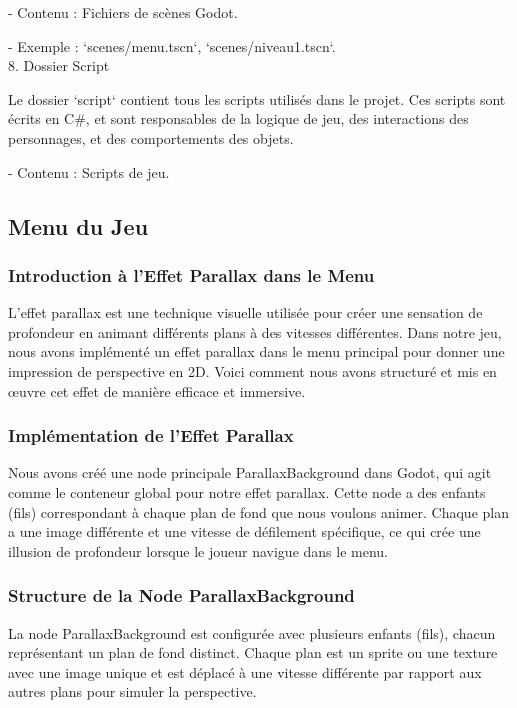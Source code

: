    - Contenu : Fichiers de scènes Godot.

   - Exemple : `scenes/menu.tscn`, `scenes/niveau1.tscn`.
\\

8. Dossier Script

   Le dossier `script` contient tous les scripts utilisés dans le projet. Ces scripts sont écrits en C\#, et sont responsables de la logique de jeu, des interactions des personnages, et des comportements des objets.

   - Contenu : Scripts de jeu.


      \subsection{Menu du Jeu }


      \subsubsection*{Introduction à l'Effet Parallax dans le Menu}
      L'effet parallax est une technique visuelle utilisée pour créer une sensation de profondeur en animant différents plans à des vitesses différentes.
      Dans notre jeu, nous avons implémenté un effet parallax dans le menu principal pour donner une impression de perspective en 2D. 
      Voici comment nous avons structuré et mis en œuvre cet effet de manière efficace et immersive.
      \\

      \subsubsection*{Implémentation de l'Effet Parallax}
      Nous avons créé une node principale ParallaxBackground dans Godot, qui agit comme le conteneur global pour notre effet parallax.
      Cette node a des enfants (fils) correspondant à chaque plan de fond que nous voulons animer. Chaque plan a une image différente et une
      vitesse de défilement spécifique, ce qui crée une illusion de profondeur lorsque le joueur navigue dans le menu.
      \\

      \subsubsection*{Structure de la Node ParallaxBackground}
      La node ParallaxBackground est configurée avec plusieurs enfants (fils), chacun représentant un plan de fond distinct.
      Chaque plan est un sprite ou une texture avec une image unique et est déplacé à une vitesse différente par rapport aux autres plans pour simuler la perspective.
      \\

